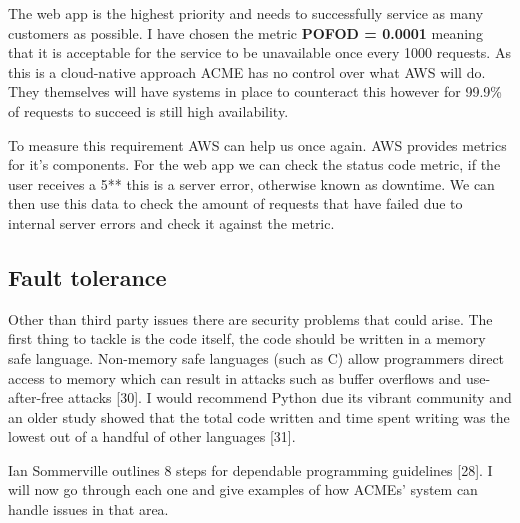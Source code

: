   The web app is the highest priority and needs to successfully service as many customers as possible.
  I have chosen the metric \textbf{POFOD = 0.0001} meaning that it is acceptable for the service to be unavailable once every 1000 requests. As this is a 
  cloud-native approach ACME has no control over what AWS will do. They themselves will have systems in place to counteract this however for 99.9\% of
  requests to succeed is still high availability.

  To measure this requirement AWS can help us once again. AWS provides metrics for it's components. For the web app we can check the status code
  metric, if the user receives a 5** this is a server error, otherwise known as downtime. We can then use this data to check the amount of requests that 
  have failed due to internal server errors and check it against the metric.

  \subsection{Fault tolerance}
  Other than third party issues there are security problems that could arise. The first thing to tackle is the code itself, the code should be written in 
  a memory safe language. Non-memory safe languages (such as C) allow programmers direct access to memory which can result in attacks such as buffer
  overflows and use-after-free attacks [30]. I would recommend Python due its  vibrant community and an older study showed
  that the total code written and time spent writing was the lowest out of a handful of other languages [31].

  Ian Sommerville outlines 8 steps for dependable programming guidelines [28]. I will now go through each one and give examples of how ACMEs' system can 
  handle issues in that area.

